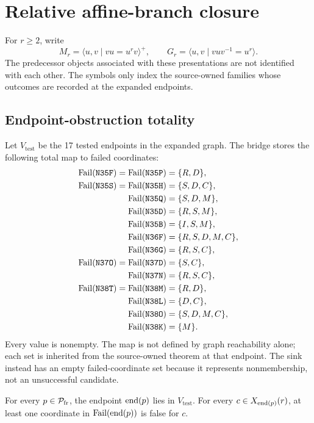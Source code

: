 \section{Relative affine-branch closure}
\label{sec:theorem}

For $r\ge2$, write
\[
M_r=\langle u,v\mid vu=u^rv\rangle^+,
\qquad
G_r=\langle u,v\mid vuv^{-1}=u^r\rangle.
\]
The predecessor objects associated with these presentations are not identified
with each other.  The symbols only index the source-owned families whose
outcomes are recorded at the expanded endpoints.

\subsection{Endpoint-obstruction totality}

Let $V_{\mathrm{test}}$ be the 17 tested endpoints in the expanded graph.  The
bridge stores the following total map to failed coordinates:
\begin{align*}
\operatorname{Fail}(\texttt{N35F})=\operatorname{Fail}(\texttt{N35P})&=\{R,D\},\\
\operatorname{Fail}(\texttt{N35S})=\operatorname{Fail}(\texttt{N35H})&=\{S,D,C\},\\
\operatorname{Fail}(\texttt{N35Q})&=\{S,D,M\},\\
\operatorname{Fail}(\texttt{N35D})&=\{R,S,M\},\\
\operatorname{Fail}(\texttt{N35B})&=\{I,S,M\},\\
\operatorname{Fail}(\texttt{N36F})&=\{R,S,D,M,C\},\\
\operatorname{Fail}(\texttt{N36G})&=\{R,S,C\},\\
\operatorname{Fail}(\texttt{N37O})=\operatorname{Fail}(\texttt{N37D})&=\{S,C\},\\
\operatorname{Fail}(\texttt{N37N})&=\{R,S,C\},\\
\operatorname{Fail}(\texttt{N38T})=\operatorname{Fail}(\texttt{N38M})&=\{R,D\},\\
\operatorname{Fail}(\texttt{N38L})&=\{D,C\},\\
\operatorname{Fail}(\texttt{N38O})&=\{S,D,M,C\},\\
\operatorname{Fail}(\texttt{N38K})&=\{M\}.
\end{align*}
Every value is nonempty.  The map is not defined by graph reachability alone;
each set is inherited from the source-owned theorem at that endpoint.  The
sink  instead has an empty failed-coordinate set because it represents
nonmembership, not an unsuccessful candidate.

\begin{lemma}
\label{lem:endpoint-totality}
For every $p\in\mathcal{P}_{\mathrm{fr}}$, the endpoint $\operatorname{end}(p)$ lies in
$V_{\mathrm{test}}$.  For every $c\in X_{\operatorname{end}(p)}(r)$, at least one coordinate
in $\operatorname{Fail}(\operatorname{end}(p))$ is false for $c$.
\end{lemma}

